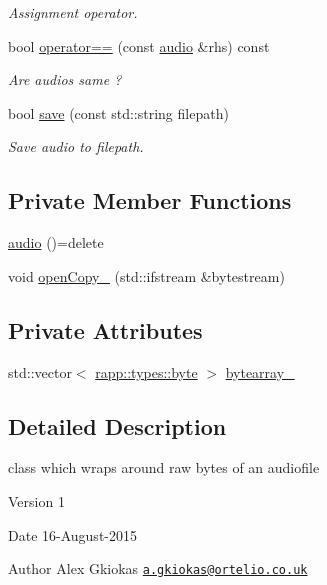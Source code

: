 \begin{DoxyCompactItemize}
\begin{DoxyCompactList}\small\item\em Assignment operator. \end{DoxyCompactList}\item 
bool \hyperlink{classrapp_1_1object_1_1audio_ab8b7346c6154da6b265b904a1a23d576}{operator==} (const \hyperlink{classrapp_1_1object_1_1audio}{audio} \&rhs) const 
\begin{DoxyCompactList}\small\item\em Are audios same ? \end{DoxyCompactList}\item 
bool \hyperlink{classrapp_1_1object_1_1audio_a5181e49b76ea2e1de3e384faca2ec3e2}{save} (const std\-::string filepath)
\begin{DoxyCompactList}\small\item\em Save audio to filepath. \end{DoxyCompactList}\end{DoxyCompactItemize}
\subsection*{Private Member Functions}
\begin{DoxyCompactItemize}
\item 
\hyperlink{classrapp_1_1object_1_1audio_abd9bb56f1a4395059f8e2cde05e8a909}{audio} ()=delete
\item 
void \hyperlink{classrapp_1_1object_1_1audio_adb16e406322d7bc1e042e300c6ee59ec}{open\-Copy\-\_\-} (std\-::ifstream \&bytestream)
\end{DoxyCompactItemize}
\subsection*{Private Attributes}
\begin{DoxyCompactItemize}
\item 
std\-::vector$<$ \hyperlink{namespacerapp_1_1types_a1dbc9dc2ab4507d8fb58ac3a204d307b}{rapp\-::types\-::byte} $>$ \hyperlink{classrapp_1_1object_1_1audio_a1ccd44fcbf55525739ef0c2f41de6878}{bytearray\-\_\-}
\end{DoxyCompactItemize}


\subsection{Detailed Description}
class which wraps around raw bytes of an audiofile 

\begin{DoxyVersion}{Version}
1 
\end{DoxyVersion}
\begin{DoxyDate}{Date}
16-\/\-August-\/2015 
\end{DoxyDate}
\begin{DoxyAuthor}{Author}
Alex Gkiokas \href{mailto:a.gkiokas@ortelio.co.uk}{\tt a.\-gkiokas@ortelio.\-co.\-uk} 
\end{DoxyAuthor}



